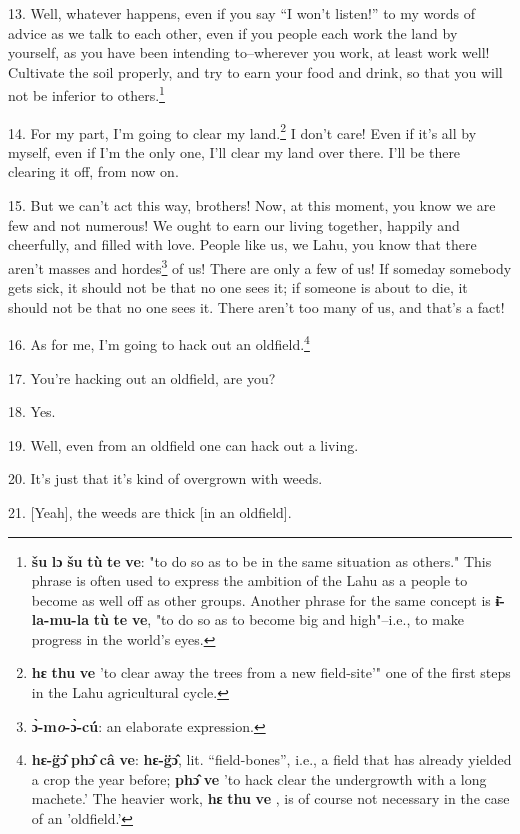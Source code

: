13. Well, whatever happens, even if you say ``I won't listen!''
to my words of advice as we talk to each other, even if you people each work the
land by yourself, as you have been intending to--wherever you work, at least work
well! Cultivate the soil properly, and try to earn your food and drink, so that
you will not be inferior to others.\footnote{\textbf{šu} \textbf{lɔ} \textbf{šu} \textbf{tù} \textbf{te} \textbf{ve}: "to do so as to be in the same situation as others." This phrase is often used to express the ambition of the Lahu as a people to become as well off as other groups. Another phrase for the same concept is \textbf{ɨ̄-la-mu-la} \textbf{tù} \textbf{te} \textbf{ve}, "to do so as to become big and high"--i.e., to make progress in the world's eyes.}

14. For my part, I'm going to clear my land.\footnote{\textbf{hɛ} \textbf{thu} \textbf{ve} 'to clear away the trees from a new field-site'" one of the first steps in the Lahu agricultural cycle.} I don't care! Even if it's all
by myself, even if I'm the only one, I'll clear my land over there. I'll be there
clearing it off, from now on.

15. But we can't act this way, brothers! Now, at this moment, you know we are few
and not numerous! We ought to earn our living together, happily and cheerfully,
and filled with love. People like us, we Lahu, you know that there aren't masses
and hordes\footnote{\textbf{ɔ̀-m\textit{\emph{o}}-ɔ̀-cú}: an elaborate expression.} of us! There are only a few of us! If someday somebody gets sick,
it should not be that no one sees it; if someone is about to die, it should not
be that no one sees it. There aren't too many of us, and that's a fact!

16. As for me, I'm going to hack out an oldfield.\footnote{\textbf{hɛ-g̈ɔ̂} \textbf{phɔ̂} \textbf{câ} \textbf{ve}: \textbf{hɛ-g̈ɔ̂}, lit. ``field-bones'', i.e., a field that has already yielded a crop the year before; \textbf{phɔ̂} \textbf{ve} 'to hack clear the undergrowth with a long machete.' The heavier work, \textbf{hɛ} \textbf{thu} \textbf{ve} , is of course not necessary in the case of an 'oldfield.'}

17. You're hacking out an oldfield, are you?

18. Yes.

19. Well, even from an oldfield one can hack out a living.

20. It's just that it's kind of overgrown with weeds.

21. [Yeah], the weeds are thick [in an oldfield].

